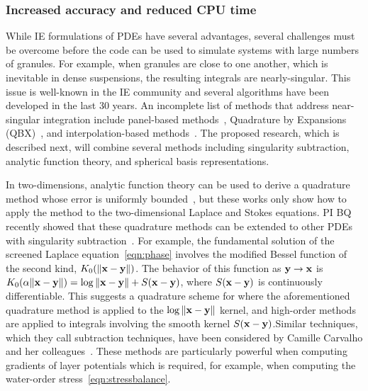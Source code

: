 \subsubsection{Increased accuracy and reduced CPU time}
\label{subsec:NumericalIssues}
While IE formulations of PDEs have several advantages, several
challenges must be overcome before the code can be used to simulate
systems with large numbers of granules. For example, when granules are
close to one another, which is inevitable in dense suspensions, the
resulting integrals are nearly-singular. This issue is well-known in the
IE community and several algorithms have been developed in the last 30
years. An incomplete list of methods that address near-singular
integration include panel-based methods~\cite{helsing_2008a,
helsing_tutorial_2012}, Quadrature by Expansions
(QBX)~\cite{din-hua-mar-tan2021, klo-bar-gre-one2013, ste-bar2022,
af2018sisc}, and interpolation-based methods~\cite{ying_2006,
qua-bir2014, rah-vee-zor-bir2015}. The proposed research, which is
described next,  will combine several methods including singularity
subtraction, analytic function theory, and spherical basis
representations.

In two-dimensions, analytic function theory can be used to derive a
quadrature method whose error is uniformly bounded~\cite{bar2014,
bar-wu-vee2015, ioa-pap-per1991}, but these works only show how to apply
the method to the two-dimensional Laplace and Stokes equations. PI BQ
recently showed that these quadrature methods can be extended to other
PDEs with singularity subtraction~\cite{che-lin-her-qua2022}. For
example, the fundamental solution of the screened Laplace
equation~\eqref{eqn:phase} involves the modified Bessel function of the
second kind, $K_0(\|\mathbf{x} - \mathbf{y}\|)$. The behavior of this function as $\mathbf{y}
\rightarrow \mathbf{x}$ is $K_0(\alpha \|\mathbf{x} - \mathbf{y}\|) = \log\|\mathbf{x} - \mathbf{y}\| +
S(\mathbf{x} - \mathbf{y})$, where $S(\mathbf{x} - \mathbf{y})$ is continuously differentiable. This
suggests a quadrature scheme for where the aforementioned quadrature
method is applied to the $\log\|\mathbf{x} - \mathbf{y}\|$ kernel, and high-order
methods~\cite{tre-wei2014} are applied to integrals involving the smooth
kernel $S(\mathbf{x} - \mathbf{y})$.Similar techniques, which they call subtraction
techniques, have been considered by Camille Carvalho and her
colleagues~\cite{car2021, car2020, car-kha-kim2018}.  These methods are
particularly powerful when computing gradients of layer potentials which
is required, for example, when computing the water-order
stress~\eqref{eqn:stressbalance}.

